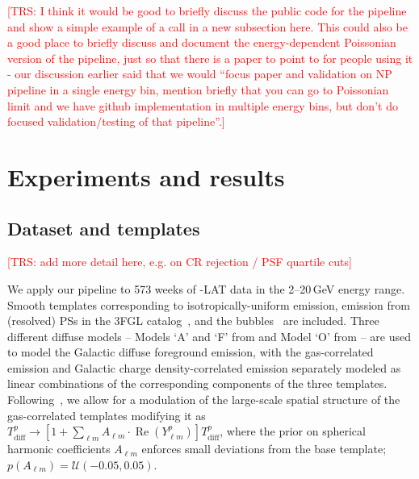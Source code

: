 \documentclass[prd,aps,10pt,nofootinbib,twocolumn,superscriptaddress,preprintnumbers,balancelastpage,longbibliography,floatfix]{revtex4-2}
\def\trs#1{\textcolor{red}{[TRS: #1]}}
\begin{document}
\trs{I think it would be good to briefly discuss the public code for the pipeline and show a simple example of a call in a new subsection here. This could also be a good place to briefly discuss and document the energy-dependent Poissonian version of the pipeline, just so that there is a paper to point to for people using it - our discussion earlier said that we would ``focus paper and validation on NP pipeline in a single energy bin, mention briefly that you can go to Poissonian limit and we have github implementation in multiple energy bins, but don't do focused validation/testing of that pipeline''.}

\section{Experiments and results} 
\label{sec:expr}


\subsection{Dataset and templates}

\trs{add more detail here, e.g. on CR rejection / PSF quartile cuts}

We apply our pipeline to 573 weeks of \Fermi-LAT data in the 2--20\,GeV energy range. Smooth templates corresponding to isotropically-uniform emission, emission from (resolved) PSs in the 3FGL catalog~\cite{Fermi-LAT:2015bhf}, and the \Fermi bubbles~\cite{Su:2010qj} are included. Three different diffuse models -- Models `A' and `F' from \citet{Calore:2014xka} and Model `O' from \citet{Macias:2019omb} -- are used to model the Galactic diffuse foreground emission, with the gas-correlated emission and Galactic charge density-correlated emission separately modeled as linear combinations of the corresponding components of the three templates. Following~\cite{Buschmann:2020adf}, we allow for a modulation of the large-scale spatial structure of the gas-correlated templates modifying it as
$T^p_{\mathrm{diff}}\rightarrow \left[1 + \sum_{\ell m} {A}_{\ell m} \cdot \operatorname{Re}\left(Y^p_{\ell m}\right) \right]T^p_{\mathrm{diff}}$, where the prior on spherical harmonic coefficients ${A}_{\ell m}$ enforces small deviations from the base template; $p\left({A}_{\ell m}\right) = \mathcal U(-0.05, 0.05)$. 
\end{document}
